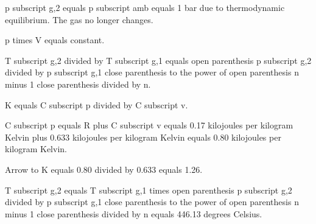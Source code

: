 p subscript g,2 equals p subscript amb equals 1 bar due to thermodynamic equilibrium. The gas no longer changes.  

p times V equals constant.  

T subscript g,2 divided by T subscript g,1 equals open parenthesis p subscript g,2 divided by p subscript g,1 close parenthesis to the power of open parenthesis n minus 1 close parenthesis divided by n.  

K equals C subscript p divided by C subscript v.  

C subscript p equals R plus C subscript v equals 0.17 kilojoules per kilogram Kelvin plus 0.633 kilojoules per kilogram Kelvin equals 0.80 kilojoules per kilogram Kelvin.  

Arrow to K equals 0.80 divided by 0.633 equals 1.26.  

T subscript g,2 equals T subscript g,1 times open parenthesis p subscript g,2 divided by p subscript g,1 close parenthesis to the power of open parenthesis n minus 1 close parenthesis divided by n equals 446.13 degrees Celsius.